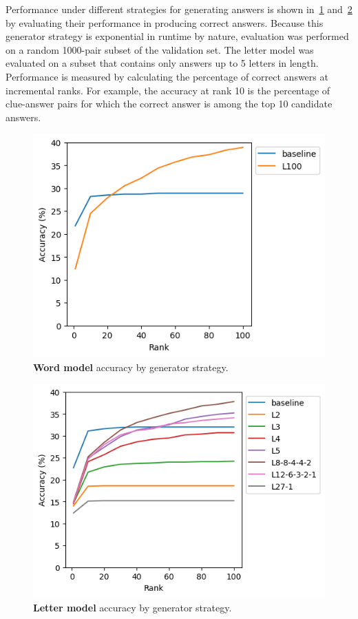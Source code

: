 \documentclass[letterpaper]{article} %
\begin{document}
\begin{NoHyper}
Performance under different strategies for generating answers is shown in~\ref{fig:onemark-acc-by-strat} and~\ref{fig:charmark-acc-by-strat} by evaluating their performance in producing correct answers.
Because this generator strategy is exponential in runtime by nature, evaluation was performed on a random 1000-pair subset of the validation set.
The letter model was evaluated on a subset that contains only answers up to 5 letters in length.
Performance is measured by calculating the percentage of correct answers at incremental ranks.
For example, the accuracy at rank 10 is the percentage of clue-answer pairs for which the correct answer is among the top 10 candidate answers.

\begin{figure}
\centering
\includegraphics[width=0.95\columnwidth]{fig-onemark-acc-by-strat}
\caption{\textbf{Word model} accuracy by generator strategy.}
\label{fig:onemark-acc-by-strat}
\end{figure}

\begin{figure}
\centering
\includegraphics[width=0.95\columnwidth]{fig-charmark-accuracy-default-tmp}
\caption{\textbf{Letter model} accuracy by generator strategy.}
\label{fig:charmark-acc-by-strat}
\end{figure}


\end{NoHyper}
\end{document}
